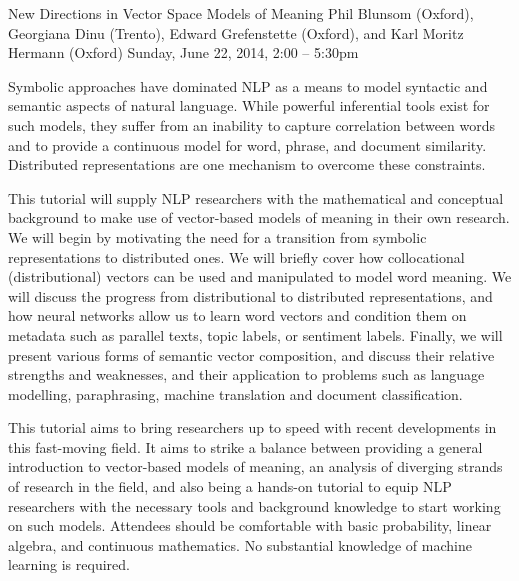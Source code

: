 \begin{tutorial}{New Directions in Vector Space Models of Meaning}
  {Phil Blunsom (Oxford), Georgiana Dinu (Trento), Edward Grefenstette (Oxford), and Karl Moritz Hermann (Oxford)}
  {Sunday, June 22, 2014, 2:00 -- 5:30pm}
  {\TutLocE}

Symbolic approaches have dominated NLP as a means to model syntactic and semantic aspects of natural language. While powerful inferential tools exist for such models, they suffer from an inability to capture correlation between words and to provide a continuous model for word, phrase, and document similarity. Distributed representations are one mechanism to overcome these constraints.

This tutorial will supply NLP researchers with the mathematical and conceptual background to make use of vector-based models of meaning in their own research. We will begin by motivating the need for a transition from symbolic representations to distributed ones. We will briefly cover how collocational (distributional) vectors can be used and manipulated to model word meaning. We will discuss the progress from distributional to distributed representations, and how neural networks allow us to learn word vectors and condition them on metadata such as parallel texts, topic labels, or sentiment labels. Finally, we will present various forms of semantic vector composition, and discuss their relative strengths and weaknesses, and their application to problems such as language modelling, paraphrasing, machine translation and document classification.

This tutorial aims to bring researchers up to speed with recent developments in this fast-moving field. It aims to strike a balance between providing a general introduction to vector-based models of meaning, an analysis of diverging strands of research in the field, and also being a hands-on tutorial to equip NLP researchers with the necessary tools and background knowledge to start working on such models. Attendees should be comfortable with basic probability, linear algebra, and continuous mathematics. No substantial knowledge of machine learning is required.

\end{tutorial}
